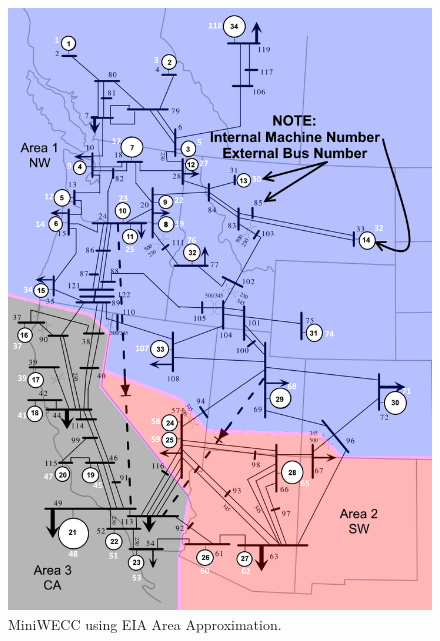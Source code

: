 \begin{figure}[H]
	\centering
	\footnotesize
	\includegraphics[width=\linewidth]{examples/miniWECC/miniWECC-split03-EIA}
	\caption{MiniWECC using EIA Area Approximation.}
	\label{fig: mw area option 2}
\end{figure}%